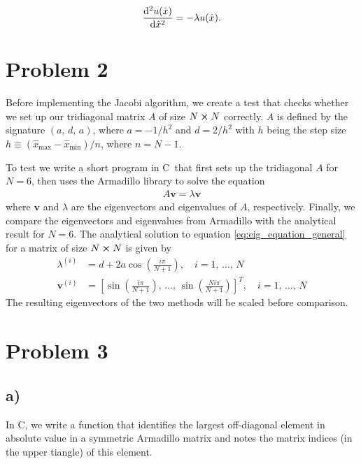 \documentclass[english,notitlepage,nofootinbib]{revtex4-1}  %
\newcommand{\CC}{C\nolinebreak\hspace{-.05em}\raisebox{.4ex}{\tiny\bf +}\nolinebreak\hspace{-.10em}\raisebox{.4ex}{\tiny\bf +}}
\renewcommand{\vec}{\mathbf}
\newcommand{\hx}{\hat{x}}
\newcommand{\closed}[1]{\left( #1 \right)}
\newcommand{\bracket}[1]{\left[ #1 \right]}
\begin{document}
\begin{align}\label{p1_scaled_eq}
    \dv[2]{u(\hat{x})}{\hat{x}} = -\lambda u(\hat{x}).
\end{align}


\section*{Problem 2}
Before implementing the Jacobi algorithm, we create a test that checks whether we set up our tridiagonal matrix $A$ of size $N\cross N$ correctly. $A$ is defined by the signature $(a,\,d,\,a)$, where $a=-1/h^2$ and $d=2/h^2$ with $h$ being the step size $h \equiv(\hx_\mathrm{max}-\hx_\mathrm{min})/n$, where $n=N-1$. 

To test we write a short program in \CC\, that first sets up the tridiagonal $A$ for $N=6$, then uses the Armadillo library to solve the equation
\begin{align}
    A\vec{v} = \lambda \vec{v} \label{eq:eig_equation_general}
\end{align} 
where $\vec{v}$ and $\lambda$ are the eigenvectors and eigenvalues of $A$, respectively. Finally, we compare the eigenvectors and eigenvalues from Armadillo with the analytical result for $N=6$. The analytical solution to equation \eqref{eq:eig_equation_general} for a matrix of size $N\cross N$ is given by  
\begin{align}
    \lambda^{(i)} &= d + 2a \cos\closed{\frac{i\pi}{N+1}},\quad i=1,\,\dots,\,N \\
    \vec{v}^{(i)} &= \bracket{ \sin\closed{\frac{i\pi}{N+1}},\,\dots,\,\sin\closed{\frac{Ni\pi}{N+1}} }^T ,\quad i=1,\,\dots,\,N
\end{align} 
The resulting eigenvectors of the two methods will be scaled before comparison. 

\section*{Problem 3}

\subsection*{a)}

In \CC, we write a function that identifies the largest off-diagonal element in absolute value in a symmetric Armadillo matrix and notes the matrix indices (in the upper tiangle) of this element.
\end{document}
